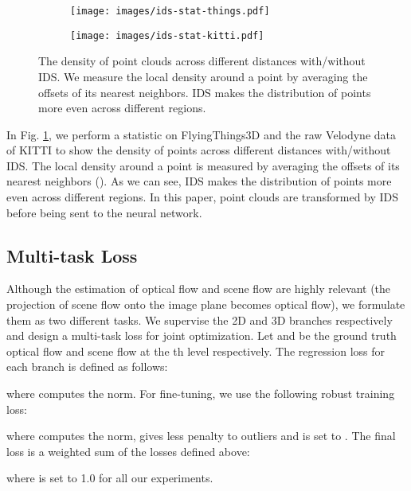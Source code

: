 \documentclass[10pt,twocolumn,letterpaper]{article}
\begin{document}
\begin{figure}[t]
    \vspace{-5pt}
    \centering
    \begin{subfigure}[b]{0.5\linewidth}
        \texttt{[image: images/ids-stat-things.pdf]}\end{subfigure}\hfill
    \begin{subfigure}[b]{0.5\linewidth}
        \texttt{[image: images/ids-stat-kitti.pdf]}\end{subfigure}\vspace{-10pt}
    \caption{The density of point clouds across different distances with/without IDS. We measure the local density around a point by averaging the offsets of its  nearest neighbors. IDS makes the distribution of points more even across different regions.}
    \vspace{-10pt}
    \label{fig:ids-stat}
\end{figure}

In Fig. \ref{fig:ids-stat}, we perform a statistic on FlyingThings3D and the raw Velodyne data of KITTI to show the density of points across different distances with/without IDS. The local density around a point is measured by averaging the offsets of its  nearest neighbors (). As we can see, IDS makes the distribution of points more even across different regions. In this paper, point clouds are transformed by IDS before being sent to the neural network. 

\subsection{Multi-task Loss}

Although the estimation of optical flow and scene flow are highly relevant (the projection of scene flow onto the image plane becomes optical flow), we formulate them as two different tasks. We supervise the 2D and 3D branches respectively and design a multi-task loss for joint optimization. Let  and  be the ground truth optical flow and scene flow at the th level respectively. The regression loss for each branch is defined as follows:

where  computes the  norm. For fine-tuning, we use the following robust training loss:

where  computes the  norm,  gives less penalty to outliers and  is set to . The final loss is a weighted sum of the losses defined above:

where  is set to 1.0 for all our experiments.
\end{document}
